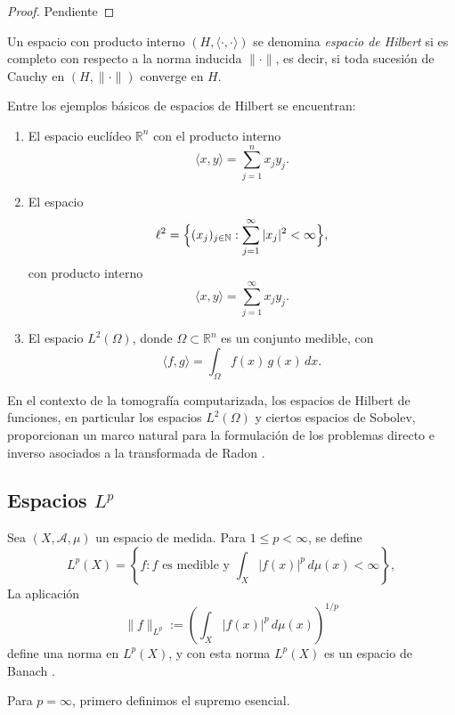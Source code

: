 \begin{proof}
    Pendiente
\end{proof}

\begin{definition}
Un espacio con producto interno $(H,\langle \cdot,\cdot \rangle)$ se denomina \emph{espacio de Hilbert} si es completo con respecto a la norma inducida $\|\cdot\|$, es decir, si toda sucesión de Cauchy en $(H,\|\cdot\|)$ converge en $H$.
\end{definition}

\begin{example}
Entre los ejemplos básicos de espacios de Hilbert se encuentran:
\begin{enumerate}
  \item El espacio euclídeo $\mathbb{R}^{n}$ con el producto interno
  \[
  \langle x,y \rangle = \sum_{j=1}^{n} x_{j} y_{j}.
  \]
  \item El espacio
  \[
  \ell^{2} = \Bigl\{ (x_{j})_{j \in \mathbb{N}} : \sum_{j=1}^{\infty} |x_{j}|^{2} < \infty \Bigr\},
  \]
  con producto interno
  \[
  \langle x,y \rangle = \sum_{j=1}^{\infty} x_{j} y_{j}.
  \]
  \item El espacio $L^{2}(\Omega)$, donde $\Omega \subset \mathbb{R}^{n}$ es un conjunto medible, con
  \[
  \langle f,g \rangle = \int_{\Omega} f(x)\,g(x)\,dx.
  \]
\end{enumerate}
\end{example}

En el contexto de la tomografía computarizada, los espacios de Hilbert de funciones, en particular los espacios $L^{2}(\Omega)$ y ciertos espacios de Sobolev, proporcionan un marco natural para la formulación de los problemas directo e inverso asociados a la transformada de Radon \cite{natterer2001,kuchment2014}.


\subsection{Espacios \texorpdfstring{$L^{p}$}{Lp}}

Sea $(X,\mathcal{A},\mu)$ un espacio de medida. Para $1 \le p < \infty$, se define
\[
L^{p}(X) = \left\{ f: f \text{ es medible y }  \int_{X} |f(x)|^{p}\, d\mu(x) < \infty \right\},
\]
La aplicación
\[
\|f\|_{L^{p}} := \left( \int_{X} |f(x)|^{p}\, d\mu(x) \right)^{1/p}
\]
define una norma en $L^{p}(X)$, y con esta norma $L^{p}(X)$ es un espacio de Banach \cite{rynne_youngson2000}.

Para $p = \infty$, primero definimos el supremo esencial.

